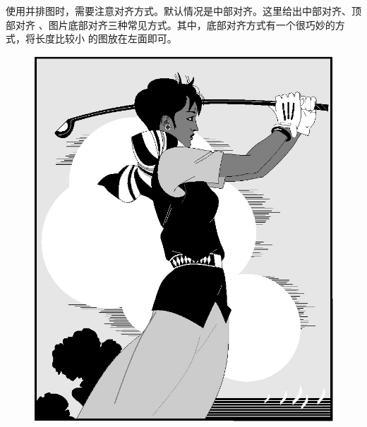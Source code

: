 使用并排图时，需要注意对齐方式。默认情况是中部对齐。这里给出中部对齐、顶部对齐
、图片底部对齐三种常见方式。其中，底部对齐方式有一个很巧妙的方式，将长度比较小
的图放在左面即可。

\begin{figure}[htbp]
  \centering
  \begin{minipage}{0.4\textwidth}
    \centering
    \includegraphics[width=\textwidth]{golfer}
  \end{minipage}
  \centering
  \begin{minipage}{0.4\textwidth}
    \centering

\end{minipage}
\end{figure}
